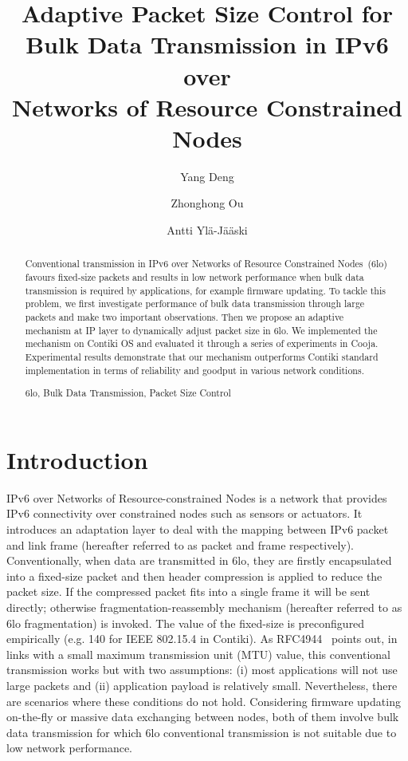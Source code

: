 \documentclass[runningheads,a4paper]{llncs}
\newcommand{\keywords}[1]{\par\addvspace\baselineskip
\noindent\keywordname\enspace\ignorespaces#1}
\begin{document}
\mainmatter

\title{Adaptive Packet Size Control for \\Bulk Data Transmission in IPv6 over\\Networks of Resource Constrained Nodes}

\author{Yang Deng\and Zhonghong Ou\and Antti Yl\"a-J\"a\"aski}


\maketitle

\begin{abstract}
Conventional transmission in IPv6 over Networks of Resource Constrained Nodes~(6lo) favours fixed-size packets and results in low network performance when bulk data transmission is required by applications, for example firmware updating. To tackle this problem, we first investigate performance of bulk data transmission through large packets and make two important observations. Then we propose an adaptive mechanism at IP layer to dynamically adjust packet size in 6lo. We implemented the mechanism on Contiki OS and evaluated it through a series of experiments in Cooja. Experimental results demonstrate that our mechanism outperforms Contiki standard implementation in terms of reliability and goodput in various network conditions.

\keywords{6lo, Bulk Data Transmission, Packet Size Control}
\end{abstract}

\section{Introduction}
IPv6 over Networks of Resource-constrained Nodes is a network that provides IPv6 connectivity over constrained nodes such as sensors or actuators. It introduces an adaptation layer to deal with the mapping between IPv6 packet and link frame (hereafter referred to as packet and frame respectively). Conventionally, when data are transmitted in 6lo, they are firstly encapsulated into a fixed-size packet and then header compression is applied to reduce the packet size. If the compressed packet fits into a single frame it will be sent directly; otherwise fragmentation-reassembly mechanism (hereafter referred to as 6lo fragmentation) is invoked. The value of the fixed-size is preconfigured empirically (e.g. 140 for IEEE 802.15.4 in Contiki). As RFC4944~\cite{Rfc4944} points out, in links with a small maximum transmission unit (MTU) value, this conventional transmission works but with two assumptions: (i) most applications will not use large packets and (ii) application payload is relatively small. Nevertheless, there are scenarios where these conditions do not hold. Considering firmware updating on-the-fly or massive data exchanging between nodes, both of them involve bulk data transmission for which 6lo conventional transmission is not suitable due to low network performance.
\end{document}
